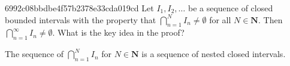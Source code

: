 \begin{note}{6992c08bbdbe4f57b2378e33cda019cd}
    Let \({ I_1, I_2, \ldots }\) be a sequence of closed bounded intervals with the property that \({ \bigcap_{n = 1}^{N} I_n \neq \emptyset }\) for all \({ N \in \mathbf{N} }\).
    Then \({ \bigcap_{n = 1}^{\infty} I_n \neq \emptyset }\).
    What is the key idea in the proof?

    \begin{cloze}{1}
        The sequence of \({ \bigcap_{n = 1}^{N} I_n }\) for \({ N \in \mathbf{N} }\) is a sequence of nested closed intervals.
    \end{cloze}
\end{note}


